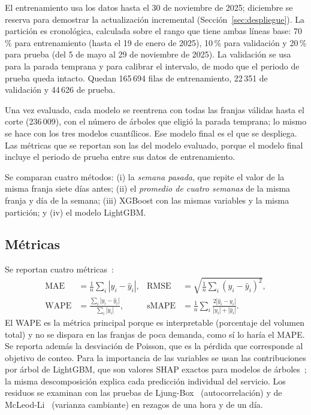 \documentclass[11pt,a4paper]{article}
\begin{document}
El entrenamiento usa los datos hasta el 30 de noviembre de 2025; diciembre se reserva para demostrar la actualización incremental (Sección~\ref{sec:despliegue}). La partición es cronológica, calculada sobre el rango que tiene ambas líneas base: 70\,\% para entrenamiento (hasta el 19 de enero de 2025), 10\,\% para validación y 20\,\% para prueba (del 5 de mayo al 29 de noviembre de 2025). La validación se usa para la parada temprana y para calibrar el intervalo, de modo que el periodo de prueba queda intacto. Quedan 165\,694 filas de entrenamiento, 22\,351 de validación y 44\,626 de prueba.

Una vez evaluado, cada modelo se reentrena con todas las franjas válidas hasta el corte (236\,009), con el número de árboles que eligió la parada temprana; lo mismo se hace con los tres modelos cuantílicos. Ese modelo final es el que se despliega. Las métricas que se reportan son las del modelo evaluado, porque el modelo final incluye el periodo de prueba entre sus datos de entrenamiento.

Se comparan cuatro métodos: (i) la \emph{semana pasada}, que repite el valor de la misma franja siete días antes; (ii) el \emph{promedio de cuatro semanas} de la misma franja y día de la semana; (iii) XGBoost con las mismas variables y la misma partición; y (iv) el modelo LightGBM.

\subsection{Métricas}

Se reportan cuatro métricas~\cite{hyndman2006another}:
\begin{align}
\mathrm{MAE} &= \frac{1}{n}\sum_i |y_i-\hat y_i|, &
\mathrm{RMSE} &= \sqrt{\frac{1}{n}\sum_i (y_i-\hat y_i)^2},\\
\mathrm{WAPE} &= \frac{\sum_i |y_i-\hat y_i|}{\sum_i |y_i|}, &
\mathrm{sMAPE} &= \frac{1}{n}\sum_i \frac{2|\hat y_i-y_i|}{|y_i|+|\hat y_i|}.
\end{align}
El WAPE es la métrica principal porque es interpretable (porcentaje del volumen total) y no se dispara en las franjas de poca demanda, como sí lo haría el MAPE. Se reporta además la desviación de Poisson, que es la pérdida que corresponde al objetivo de conteo. Para la importancia de las variables se usan las contribuciones por árbol de LightGBM, que son valores SHAP exactos para modelos de árboles~\cite{lundberg2017unified}; la misma descomposición explica cada predicción individual del servicio. Los residuos se examinan con las pruebas de Ljung-Box~\cite{ljung1978measure} (autocorrelación) y de McLeod-Li~\cite{mcleod1983diagnostic} (varianza cambiante) en rezagos de una hora y de un día.
\end{document}
